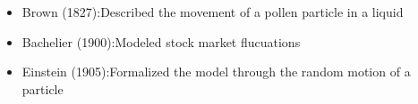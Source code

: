 \documentclass[../chapter01.tex]{subfile}
\begin{document}
\begin{itemize}
  \item Brown (1827):\@ Described the movement of a pollen particle in a liquid
  \item Bachelier (1900):\@ Modeled stock market flucuations
  \item Einstein (1905):\@ Formalized the model through the random motion of a particle
\end{itemize}
\end{document}
